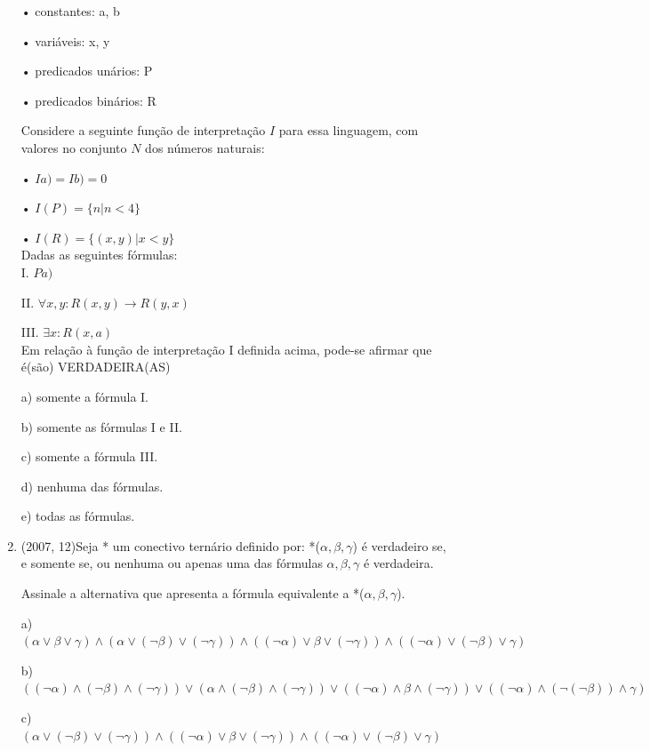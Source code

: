 \documentclass{article}
\begin{document}
\begin{enumerate}
• constantes: a, b

• variáveis: x, y

• predicados unários: P

• predicados binários: R

Considere a seguinte função de interpretação $I$ para essa linguagem, com valores no
conjunto $N$ dos números naturais:

• $Ia) = Ib) = 0$

• $I(P ) = \{n | n < 4\}$

• $I(R) = \{(x, y) | x < y\}$\\

Dadas as seguintes fórmulas:\\

I. $P a)$

II. $\forall x, y : R(x, y) \rightarrow R(y, x)$

III. $\exists x : R(x, a)$\\

Em relação à função de interpretação I definida acima, pode-se afirmar que é(são) VERDADEIRA(AS)

a) somente a fórmula I.

b) somente as fórmulas I e II.

c) somente a fórmula III.

d) nenhuma das fórmulas.

e) todas as fórmulas.\newline



\item(2007, 12)Seja * um conectivo ternário definido por: *($\alpha, \beta, \gamma$) é verdadeiro se, e somente se, ou nenhuma ou apenas uma das fórmulas $\alpha, \beta, \gamma$ é verdadeira.

Assinale a alternativa que apresenta a fórmula equivalente a  *($\alpha, \beta, \gamma$).

a) $(\alpha \vee \beta \vee \gamma) \wedge(\alpha \vee(\neg \beta) \vee(\neg \gamma)) \wedge((\neg \alpha) \vee \beta \vee(\neg \gamma)) \wedge((\neg \alpha) \vee(\neg \beta) \vee \gamma)$

b) $((\neg \alpha) \wedge(\neg \beta) \wedge(\neg \gamma)) \vee(\alpha \wedge(\neg \beta) \wedge(\neg \gamma)) \vee((\neg \alpha) \wedge \beta \wedge(\neg \gamma)) \vee((\neg \alpha) \wedge(\neg(\neg \beta)) \wedge \gamma)$

c) $(\alpha \vee(\neg \beta) \vee(\neg \gamma)) \wedge((\neg \alpha) \vee \beta \vee(\neg \gamma)) \wedge((\neg \alpha) \vee(\neg \beta) \vee \gamma)$


\end{enumerate}
\end{document}
